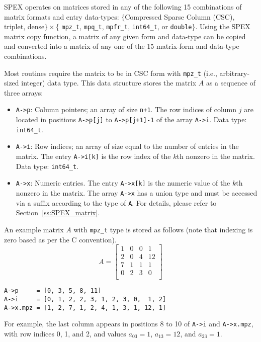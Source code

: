 \documentclass[12pt]{report}
\theoremstyle{definition}
\begin{document}
SPEX operates on matrices stored in any of the following 15 combinations of matrix formats and entry data-types: 
$\{$Compressed Sparse Column (CSC), triplet, dense$\} \times \{$ \verb|mpz_t|,
\verb|mpq_t|, \verb|mpfr_t|, \verb|int64_t|, or \verb|double|$\}$. Using the SPEX matrix copy function, a matrix of any given form and data-type can be copied and converted into a matrix of any one of the 15 matrix-form and data-type combinations.

Most routines require the matrix to be in CSC form with \verb|mpz_t| (i.e., arbitrary-sized integer) data
type. This data structure stores the matrix $A$ as a sequence of three arrays:

\begin{itemize}
\item
\verb|A->p|: Column pointers; an array of size \verb|n+1|. The row indices of
column $j$ are located in positions \verb|A->p[j]| to \verb|A->p[j+1]-1| of the
array \verb|A->i|. Data type: \verb|int64_t|.

\item
\verb|A->i|: Row indices; an array of size equal to the number of entries in
the matrix. The entry \verb|A->i[k]| is the row index of the $k$th nonzero in
the matrix. Data type: \verb|int64_t|.

\item
\verb|A->x|: Numeric entries. The entry \verb|A->x[k]| is the numeric value of
the $k$th nonzero in the matrix.  The array \verb|A->x| has a union type and
must be accessed via a suffix according to the type of \verb|A|.  For details,
please refer to Section~\ref{ss:SPEX_matrix}.

\end{itemize}

An example matrix $A$ with \verb|mpz_t| type is stored as follows (note that indexing is zero based as per the C convention).
\[
A = \begin{bmatrix}
1 & 0 & 0 & 1 \\
2 & 0 & 4 & 12 \\
7 & 1 & 1 & 1 \\
0 & 2 & 3 & 0 \\
\end{bmatrix}
\]

\begin{verbatim}
A->p     = [0, 3, 5, 8, 11]
A->i     = [0, 1, 2, 2, 3, 1, 2, 3, 0,  1, 2]
A->x.mpz = [1, 2, 7, 1, 2, 4, 1, 3, 1, 12, 1]
\end{verbatim}

For example, the last column appears in positions 8 to 10 of \verb|A->i| and \verb|A->x.mpz|, with row indices 0, 1, and 2, and values $a_{03}=1$, $a_{13}=12$, and $a_{23}=1$.
\end{document}
